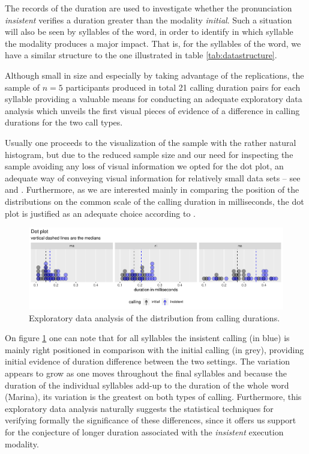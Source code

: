 \documentclass[11pt]{article}
\begin{document}
The records of the duration are used to investigate whether the pronunciation {\it{insistent}} verifies a duration greater than the  modality {\it{initial}}. Such a situation will also be seen by syllables of the word, in order to identify in which syllable the modality produces a major impact. That is, for the syllables of the word, we have a similar structure to the one illustrated in table \ref{tab:datastructure}.

Although small in size and especially by taking advantage of the replications, the sample of $n=5$ participants produced in total 21 calling duration pairs for each syllable providing a valuable means for conducting an adequate exploratory data analysis which unveils the first visual pieces of evidence of a difference in calling durations for the two call types. 

Usually one proceeds to the visualization of the sample with the rather natural histogram, but due to the reduced sample size and our need for inspecting the sample avoiding any loss of visual information we opted for the dot plot, an adequate way of conveying visual information for relatively small data sets -- see  and . Furthermore, as we are interested mainly in comparing the position of the distributions on the common scale of the calling duration in milliseconds, the dot plot is justified as an adequate choice according to .

\begin{figure}[ht]
    \centering
    \includegraphics[width=1\textwidth]{dotplot.pdf}
    \caption{Exploratory data analysis of the distribution from calling durations.}\label{fig:dotplot_EDA}
\end{figure}

On figure \ref{fig:dotplot_EDA} one can note that for all syllables the insistent calling (in blue) is mainly right positioned in comparison with the initial calling (in grey), providing initial evidence of duration difference between the two settings. The variation appears to grow as one moves throughout the final syllables and because the duration of the individual syllables add-up to the duration of the whole word (Marina), its variation is the greatest on both types of calling. Furthermore, this exploratory data analysis naturally suggests the statistical techniques for verifying formally the significance of these differences, since it offers us support for the conjecture of longer duration associated with the {\it{insistent}} execution modality.
\end{document}
